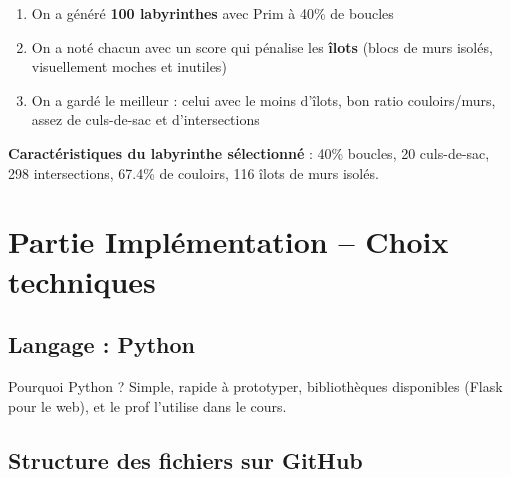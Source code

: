 \documentclass[12pt,a4paper]{article}
\begin{document}
\begin{enumerate}
    \item On a généré \textbf{100 labyrinthes} avec Prim à 40\% de boucles
    \item On a noté chacun avec un score qui pénalise les \textbf{îlots} (blocs de murs isolés, visuellement moches et inutiles)
    \item On a gardé le meilleur : celui avec le moins d'îlots, bon ratio couloirs/murs, assez de culs-de-sac et d'intersections
\end{enumerate}

\textbf{Caractéristiques du labyrinthe sélectionné} : 40\% boucles, 20 culs-de-sac, 298 intersections, 67.4\% de couloirs, 116 îlots de murs isolés.

\section{Partie Implémentation -- Choix techniques}

\subsection{Langage : Python}

\begin{choixbox}
Pourquoi Python ? Simple, rapide à prototyper, bibliothèques disponibles (Flask pour le web), et le prof l'utilise dans le cours.
\end{choixbox}

\subsection{Structure des fichiers sur GitHub}
\end{document}
